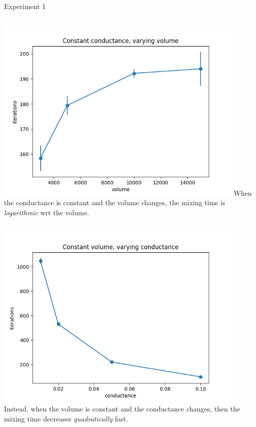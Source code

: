 \documentclass[../main.tex]{subfiles}
\begin{document}
	\begin{frame}{Experiment 1}
		\begin{columns}
		\includegraphics[width=0.9\textwidth]{Figures/const_cond}  
		When the conductance is constant and the volume changes, the mixing time is \textit{logarithmic} wrt the volume. 
		\end{columns} 
		\begin{columns}
			\column{0.5\textwidth}
			\includegraphics[width=0.9\textwidth]{Figures/const_vol}  
			\column{0.4\textwidth}
			Instead, when the volume is constant and the conductance changes, then the mixing time decreases \textit{quadratically} fast.
		\end{columns} 
	\end{frame}
\end{document}
